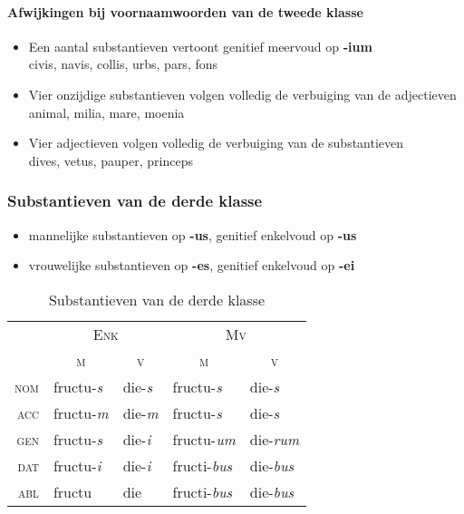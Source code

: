 \documentclass[12pt,a4paper]{article}
\begin{document}
\paragraph{Afwijkingen bij voornaamwoorden van de tweede klasse}
\begin{itemize}
    \item Een aantal substantieven vertoont genitief meervoud op \textbf{-ium} \\
        civis, navis, collis, urbs, pars, fons
    \item Vier onzijdige substantieven volgen volledig de verbuiging van de adjectieven \\
        animal, milia, mare, moenia
    \item Vier adjectieven volgen volledig de verbuiging van de substantieven \\
        dives, vetus, pauper, princeps
\end{itemize}

\subsubsection{Substantieven van de derde klasse}
\begin{itemize}
    \item mannelijke substantieven op \textbf{-us}, genitief enkelvoud op \textbf{-us}
    \item vrouwelijke substantieven op \textbf{-es}, genitief enkelvoud op \textbf{-ei}
\end{itemize}

\begin{table}[H]
\centering
\begin{tabular}{ r | l l | l l }
\toprule
 & \multicolumn{2}{c|}{\textsc{Enk}} & \multicolumn{2}{c}{\textsc{Mv}} \\
 & \multicolumn{1}{c}{\textsc{m}} & \multicolumn{1}{c|}{\textsc{v}} & \multicolumn{1}{c}{\textsc{m}} & \multicolumn{1}{c}{\textsc{v}} \\ 
\midrule
\textsc{nom} & fructu-\emph{s} & die-\emph{s} & fructu-\emph{s}   & die-\emph{s}   \\
\textsc{acc} & fructu-\emph{m} & die-\emph{m} & fructu-\emph{s}   & die-\emph{s}   \\
\textsc{gen} & fructu-\emph{s} & die-\emph{i} & fructu-\emph{um}  & die-\emph{rum} \\
\textsc{dat} & fructu-\emph{i} & die-\emph{i} & fructi-\emph{bus} & die-\emph{bus} \\
\textsc{abl} & fructu          & die          & fructi-\emph{bus} & die-\emph{bus} \\
\bottomrule
\end{tabular}
\caption{Substantieven van de derde klasse}
\label{tab:subst3}
\end{table}
\end{document}
